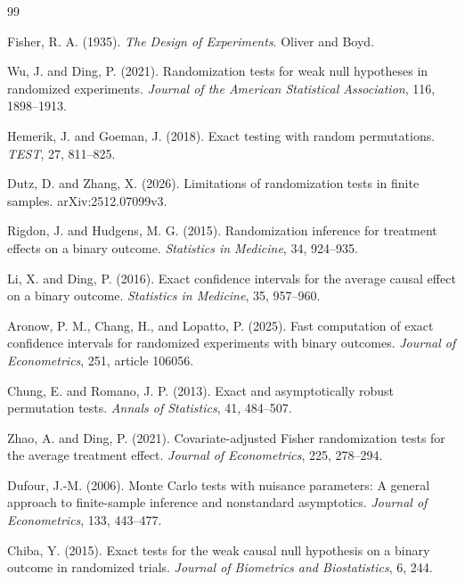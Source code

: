 \documentclass{article}
\begin{document}
\begin{thebibliography}{99}

   Fisher, R. A. (1935). \emph{The Design of Experiments}. Oliver and Boyd.

   Wu, J. and Ding, P. (2021). Randomization tests for weak null hypotheses in randomized experiments. \emph{Journal of the American Statistical Association}, 116, 1898--1913.

   Hemerik, J. and Goeman, J. (2018). Exact testing with random permutations. \emph{TEST}, 27, 811--825.

   Dutz, D. and Zhang, X. (2026). Limitations of randomization tests in finite samples. arXiv:2512.07099v3.

   Rigdon, J. and Hudgens, M. G. (2015). Randomization inference for treatment effects on a binary outcome. \emph{Statistics in Medicine}, 34, 924--935.

   Li, X. and Ding, P. (2016). Exact confidence intervals for the average causal effect on a binary outcome. \emph{Statistics in Medicine}, 35, 957--960.

   Aronow, P. M., Chang, H., and Lopatto, P. (2025). Fast computation of exact confidence intervals for randomized experiments with binary outcomes. \emph{Journal of Econometrics}, 251, article 106056.

   Chung, E. and Romano, J. P. (2013). Exact and asymptotically robust permutation tests. \emph{Annals of Statistics}, 41, 484--507.

   Zhao, A. and Ding, P. (2021). Covariate-adjusted Fisher randomization tests for the average treatment effect. \emph{Journal of Econometrics}, 225, 278--294.

   Dufour, J.-M. (2006). Monte Carlo tests with nuisance parameters: A general approach to finite-sample inference and nonstandard asymptotics. \emph{Journal of Econometrics}, 133, 443--477.

   Chiba, Y. (2015). Exact tests for the weak causal null hypothesis on a binary outcome in randomized trials. \emph{Journal of Biometrics and Biostatistics}, 6, 244.

\end{thebibliography}
\end{document}

